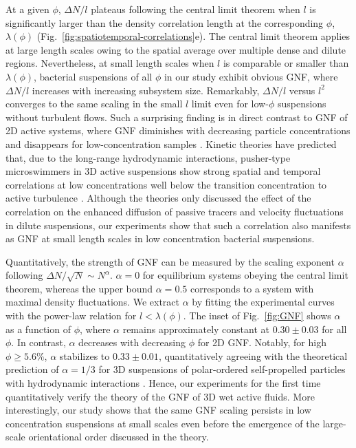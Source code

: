 \documentclass[twocolumn,aps,prx,amsmath,amssymb,longbibliography,superscriptaddress]{revtex4-2}
\begin{document}
At a given $\phi$, $\Delta N/l$ plateaus following the central limit theorem when $l$ is significantly larger than the density correlation length at the corresponding $\phi$, $\lambda(\phi)$ (Fig.~\ref{fig:spatiotemporal-correlations}e). The central limit theorem applies at large length scales owing to the spatial average over multiple dense and dilute regions. Nevertheless, at small length scales when $l$ is comparable or smaller than $\lambda(\phi)$, bacterial suspensions of all $\phi$ in our study exhibit obvious GNF, where $\Delta N/l$ increases with increasing subsystem size. Remarkably, $\Delta N/l$ versus $l^2$ converges to the same scaling in the small $l$ limit even for low-$\phi$ suspensions without turbulent flows. Such a surprising finding is in direct contrast to GNF of 2D active systems, where GNF diminishes with decreasing particle concentrations and disappears for low-concentration samples \cite{Narayan2007,Aranson2008,Kudrolli2008,Deseigne2010,Zhang2010,Schaller2013}. Kinetic theories have predicted that, due to the long-range hydrodynamic interactions, pusher-type microswimmers in 3D active suspensions show strong spatial and temporal correlations at low concentrations well below the transition concentration to active turbulence \cite{Stenhammar2017,Nambiar2021}. Although the theories only discussed the effect of the correlation on the enhanced diffusion of passive tracers and velocity fluctuations in dilute suspensions, our experiments show that such a correlation also manifests as GNF at small length scales in low concentration bacterial suspensions.


Quantitatively, the strength of GNF can be measured by the scaling exponent $\alpha$ following $\Delta N/\sqrt{N} \sim N^\alpha$. $\alpha=0$ for equilibrium systems obeying the central limit theorem, whereas the upper bound $\alpha = 0.5$ corresponds to a system with maximal density fluctuations.
We extract $\alpha$ by fitting the experimental curves with the power-law relation for $l < \lambda(\phi)$. The inset of Fig.~\ref{fig:GNF} shows $\alpha$ as a function of $\phi$, where $\alpha$ remains approximately constant at $0.30 \pm 0.03$ for all $\phi$. In contrast, $\alpha$ decreases with decreasing $\phi$ for 2D GNF. Notably, for high $\phi \geq 5.6\%$, $\alpha$ stabilizes to $0.33 \pm 0.01$, quantitatively agreeing with the theoretical prediction of $\alpha = 1/3$ for 3D suspensions of polar-ordered self-propelled particles with hydrodynamic interactions \cite{AditiSimha2002}. Hence, our experiments for the first time quantitatively verify the theory of the GNF of 3D wet active fluids. More interestingly, our study shows that the same GNF scaling persists in low concentration suspensions at small scales even before the emergence of the large-scale orientational order discussed in the theory.
\end{document}
